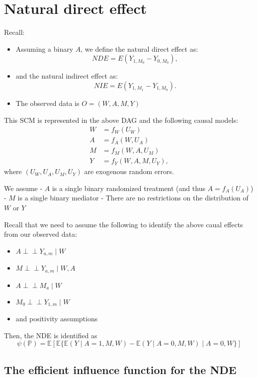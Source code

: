 \documentclass[
  12pt,
]{book}
\providecommand{\tightlist}{%
  \setlength{\itemsep}{0pt}\setlength{\parskip}{0pt}}
\theoremstyle{definition}
\theoremstyle{definition}
\theoremstyle{definition}
\newcommand{\indep}{\mbox{$\perp\!\!\!\perp$}}
\renewcommand{\P}{\mathbb{P}}
\newcommand{\E}{\mathbb{E}}
\newcommand{\1}{\mathbbm{1}}
\begin{document}
\hypertarget{natural-direct-effect}{%
\section{Natural direct effect}\label{natural-direct-effect}}

Recall:

\begin{itemize}
\item
  Assuming a binary \(A\), we define the natural direct effect as: \[NDE = E(Y_{1,M_{0}} - Y_{0,M_{0}}),\]
\item
  and the natural indirect effect as: \[NIE = E(Y_{1,M_{1}} - Y_{1,M_{0}}).\]
\item
  The observed data is \(O=(W, A, M, Y)\)
\end{itemize}

This SCM is represented in the above DAG and the following causal models:
\begin{align*}
  W & = f_W(U_W)\\
  A & = f_A(W, U_A)\\
  M & = f_M(W, A, U_M)\\
  Y & = f_Y(W, A, M, U_Y),
\end{align*}
where \((U_W, U_A,U_M, U_Y)\) are exogenous random errors.

We assume
- \(A\) is a single binary randomized treatment (and thus \(A = f_A(U_A)\))
- \(M\) is a single binary mediator
- There are no restrictions on the distribution of \(W\) or \(Y\)

Recall that we need to assume the following to identify the above caual effects
from our observed data:

\begin{itemize}
\tightlist
\item
  \(A \indep Y_{a,m} \mid W\)
\item
  \(M \indep Y_{a,m} \mid W, A\)
\item
  \(A \indep M_a \mid W\)
\item
  \(M_0 \indep Y_{1,m} \mid W\)
\item
  and positivity assumptions
\end{itemize}

Then, the NDE is identified as
\begin{equation*}
    \psi(\P) =  \E[\E\{\E(Y \mid A=1, M, W) - \E(Y \mid A=0, M, W)\mid A=0,W\}]
  \end{equation*}

\hypertarget{the-efficient-influence-function-for-the-nde}{%
\subsection{The efficient influence function for the NDE}\label{the-efficient-influence-function-for-the-nde}}
\end{document}
